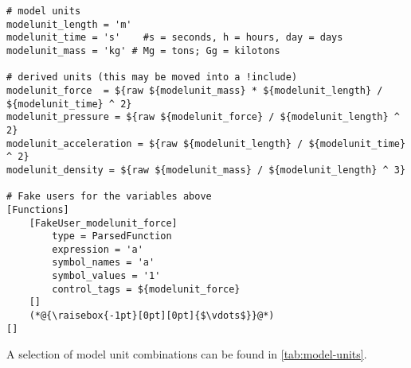 \begin{lstlisting}[language=Moose, caption={Set of consistent physical units in a Moose input file},label={patterns-physical-unit-set}]
# model units
modelunit_length = 'm'
modelunit_time = 's'    #s = seconds, h = hours, day = days
modelunit_mass = 'kg' # Mg = tons; Gg = kilotons

# derived units (this may be moved into a !include)
modelunit_force  = ${raw ${modelunit_mass} * ${modelunit_length} / ${modelunit_time} ^ 2}
modelunit_pressure = ${raw ${modelunit_force} / ${modelunit_length} ^ 2}
modelunit_acceleration = ${raw ${modelunit_length} / ${modelunit_time} ^ 2}
modelunit_density = ${raw ${modelunit_mass} / ${modelunit_length} ^ 3}

# Fake users for the variables above
[Functions]
    [FakeUser_modelunit_force]
        type = ParsedFunction
        expression = 'a'
        symbol_names = 'a'
        symbol_values = '1'
        control_tags = ${modelunit_force}
    []
    (*@{\raisebox{-1pt}[0pt][0pt]{$\vdots$}}@*)
[]
\end{lstlisting}

A selection of model unit combinations can be found in
\autoref{tab:model-units}.

